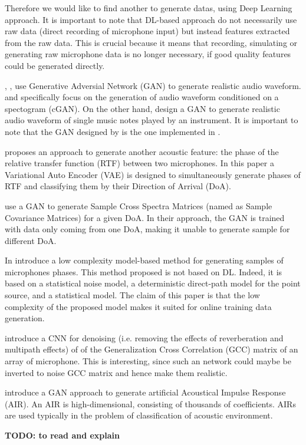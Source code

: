 \documentclass{article}
\begin{document}
Therefore we would like to find another to generate datas, using Deep Learning approach. It is important to note that DL-based approach do not necessarily use raw data (direct recording of microphone input) but instead features extracted from the raw data. This is crucial because it means that recording, simulating or generating raw microphone data is no longer necessary, if good quality features could be generated directly.

\cite{neekhara2019expediting}, \cite{NEURIPS2019_6804c9bc}, \cite{engel2019gansynth} use Generative Adversial Network (GAN) to generate realistic audio waveform. \cite{neekhara2019expediting} and \cite{NEURIPS2019_6804c9bc} specifically focus on the generation of audio waveform conditioned on a spectogram (cGAN). On the other hand, \cite{engel2019gansynth} design a GAN to generate realistic audio waveform of single music notes played by an instrument. It is important to note that the GAN designed by \cite{neekhara2019expediting} is the one implemented in \cite{vargas2021improved}. 

\cite{bianco2020semi} proposes an approach to generate another acoustic feature: the phase of the relative transfer function (RTF) between two microphones. In this paper a Variational Auto Encoder (VAE) is designed to simultaneously generate phases of RTF and classifying them by their Direction of Arrival (DoA).

\cite{gerstoft2020parametric} use a GAN to generate Sample Cross Spectra Matrices (named as Sample Covariance Matrices) for a given DoA. In their approach, the GAN is trained with data only coming from one DoA, making it unable to generate sample for different DoA.

In \cite{hubner2021efficient} introduce a low complexity model-based method for generating samples of microphones phases. This method proposed is not based on DL. Indeed, it is based on a statistical noise model, a deterministic direct-path model for the point source, and a statistical model. The claim of this paper is that the low complexity of the proposed  model makes it suited for online training data generation. 

\cite{vera2021acoustic} introduce a CNN for denoising (i.e. removing the effects of reverberation and multipath effects) of of the Generalization Cross Correlation (GCC) matrix of an array of microphone. This is interesting, since such an network could maybe be inverted to noise GCC matrix and hence make them realistic. 

\cite{papayiannis2019data} introduce a GAN approach to generate artificial Acoustical Impulse Response (AIR). An AIR is high-dimensional, consisting of thousands of coefficients. AIRs are used typically in the problem of classification of acoustic environment.

\cite{ratnarajah2021fast} \textbf{TODO: to read and explain}






%

 
\end{document}
